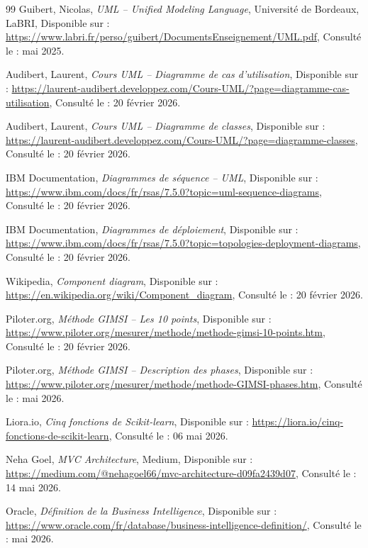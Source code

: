 \documentclass[12pt, oneside, a4paper]{report}
\begin{document}
\begin{thebibliography}{99}
Guibert, Nicolas,
\textit{UML -- Unified Modeling Language},
Université de Bordeaux, LaBRI,
Disponible sur : \url{https://www.labri.fr/perso/guibert/DocumentsEnseignement/UML.pdf},
Consulté le : mai 2025.

Audibert, Laurent,
\textit{Cours UML -- Diagramme de cas d'utilisation},
Disponible sur : \url{https://laurent-audibert.developpez.com/Cours-UML/?page=diagramme-cas-utilisation},
Consulté le : 20 février 2026.

Audibert, Laurent,
\textit{Cours UML -- Diagramme de classes},
Disponible sur : \url{https://laurent-audibert.developpez.com/Cours-UML/?page=diagramme-classes},
Consulté le : 20 février 2026.

IBM Documentation,
\textit{Diagrammes de séquence -- UML},
Disponible sur : \url{https://www.ibm.com/docs/fr/rsas/7.5.0?topic=uml-sequence-diagrams},
Consulté le : 20 février 2026.

IBM Documentation,
\textit{Diagrammes de déploiement},
Disponible sur : \url{https://www.ibm.com/docs/fr/rsas/7.5.0?topic=topologies-deployment-diagrams},
Consulté le : 20 février 2026.

Wikipedia,
\textit{Component diagram},
Disponible sur : \url{https://en.wikipedia.org/wiki/Component_diagram},
Consulté le : 20 février 2026.

Piloter.org,
\textit{Méthode GIMSI -- Les 10 points},
Disponible sur : \url{https://www.piloter.org/mesurer/methode/methode-gimsi-10-points.htm},
Consulté le : 20 février 2026.

Piloter.org,
\textit{Méthode GIMSI -- Description des phases},
Disponible sur : \url{https://www.piloter.org/mesurer/methode/methode-GIMSI-phases.htm},
Consulté le : mai 2026.

Liora.io,
\textit{Cinq fonctions de Scikit-learn},
Disponible sur : \url{https://liora.io/cinq-fonctions-de-scikit-learn},
Consulté le : 06 mai 2026.

Neha Goel,
\textit{MVC Architecture},
Medium,
Disponible sur :
\url{https://medium.com/@nehagoel66/mvc-architecture-d09fa2439d07},
Consulté le : 14 mai 2026.

Oracle,
\textit{Définition de la Business Intelligence},
Disponible sur : \url{https://www.oracle.com/fr/database/business-intelligence-definition/},
Consulté le : mai 2026.


\end{thebibliography}
\end{document}
